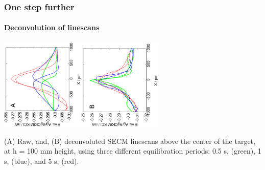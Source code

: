 \documentclass{beamer}
\begin{document}


\begin{frame}
\frametitle{One step further}
\framesubtitle{Deconvolution of linescans}
\begin{center}
\includegraphics[trim = 0mm 0mm 0mm 0mm, clip, width=0.3\textwidth, angle=-90]{raw_lines_pH.eps}\includegraphics[trim = 0mm 0mm 0mm 0mm, clip, width=0.3\textwidth, angle=-90]{deconvoluted_lines_pH.eps}
\end{center}
(A) Raw, and, (B) deconvoluted SECM linescans above the center of the target, at h = 100 mm height, using three different equilibration periods: 0.5 s, (green), 1 s, (blue), and 5 s, (red).
\end{frame}
\end{document}

